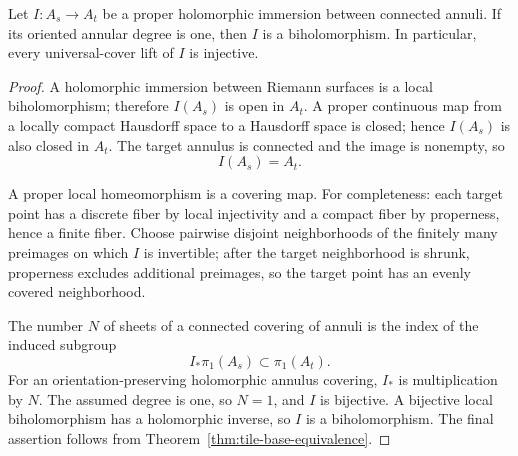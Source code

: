 \begin{proposition}
\label{prop:properness-biholomorphism}
Let \(I:A_s\to A_t\) be a proper holomorphic immersion between
connected annuli.  If its oriented annular degree is one, then \(I\)
is a biholomorphism.  In particular, every universal-cover lift of
\(I\) is injective.
\end{proposition}

\begin{proof}
A holomorphic immersion between Riemann surfaces is a local
biholomorphism; therefore \(I(A_s)\) is open in \(A_t\).  A proper
continuous map from a locally compact Hausdorff space to a Hausdorff
space is closed; hence \(I(A_s)\) is also closed in \(A_t\).  The
target annulus is connected and the image is nonempty, so
\[
 I(A_s)=A_t .
\]

A proper local homeomorphism is a covering map.  For completeness:
each target point has a discrete fiber by local injectivity and a
compact fiber by properness, hence a finite fiber.  Choose pairwise
disjoint neighborhoods of the finitely many preimages on which \(I\)
is invertible; after the target neighborhood is shrunk, properness
excludes additional preimages, so the target point has an evenly
covered neighborhood.

The number \(N\) of sheets of a connected covering of annuli is the
index of the induced subgroup
\[
 I_*\pi_1(A_s)\subset\pi_1(A_t).
\]
For an orientation-preserving holomorphic annulus covering, \(I_*\) is
multiplication by \(N\).  The assumed degree is one, so \(N=1\), and
\(I\) is bijective.  A bijective local biholomorphism has a
holomorphic inverse, so \(I\) is a biholomorphism.  The final
assertion follows from Theorem~\ref{thm:tile-base-equivalence}.
\end{proof}